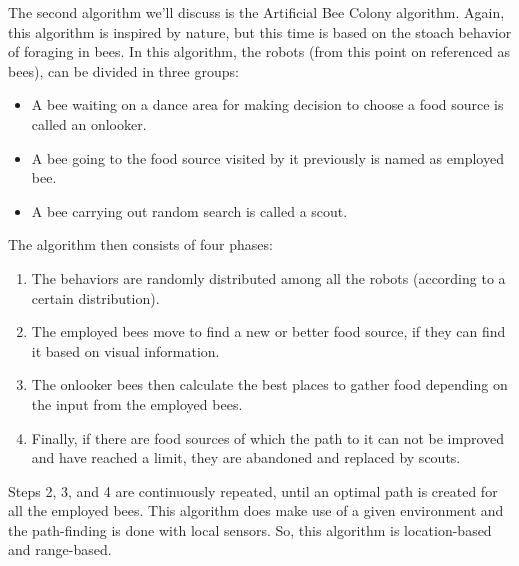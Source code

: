 The second algorithm we'll discuss is the Artificial Bee Colony algorithm. \cite{Bhattacharjee}
Again, this algorithm is inspired by nature, but this time is based on the stoach behavior of foraging in bees.
In this algorithm, the robots (from this point on referenced as bees), can be divided in three groups:
\begin{itemize}
	\item A bee waiting on a dance area for making decision to choose a food source is called an onlooker.
	\item A bee going to the food source visited by it previously is named as employed bee.
	\item A bee carrying out random search is called a scout.
\end{itemize}
The algorithm then consists of four phases:
\begin{enumerate}
	\item The behaviors are randomly distributed among all the robots (according to a certain distribution).
	\item The employed bees move to find a new or better food source, if they can find it based on visual information. 
	\item The onlooker bees then calculate the best places to gather food depending on the input from the employed bees.
	\item Finally, if there are food sources of which the path to it can not be improved and have reached a limit, they are abandoned and replaced by scouts.
\end{enumerate}

Steps 2, 3, and 4 are continuously repeated, until an optimal path is created for all the employed bees.
This algorithm does make use of a given environment and the path-finding is done with local sensors. 
So, this algorithm is location-based and range-based.
